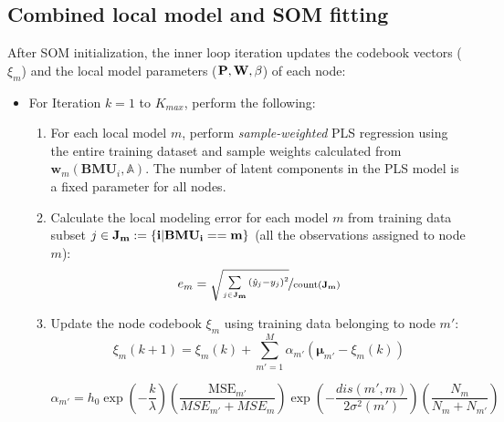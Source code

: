 \documentclass[review,3p]{elsarticle}
\renewcommand\[{\begin{equation}}
\renewcommand\]{\end{equation}}
\begin{document}
\subsection{Combined local model and SOM fitting}
After SOM initialization, the inner loop iteration updates the codebook
vectors ($\xi_m$) and the local model parameters ($\bf{P,W,\beta}$) of each node:
\begin{itemize}
\item For Iteration $k = 1$ to $K_{max}$, perform the following:

    \begin{enumerate}
    \item For each local model $m$, perform \emph{sample-weighted} PLS
        regression using the entire training dataset and sample weights
        calculated from $\mathbf w_m(\mathbf{BMU}_i,\mathbb A)$. The
        number of latent components in the PLS model is a fixed parameter
        for all nodes.
        \item Calculate the local modeling error for each model $m$ from training
            data subset $j \in \bf J_m := \{i | BMU_i == m\}$ (all the
            observations assigned to node $m$):
            \[{e_m} = \nicefrac{{\sqrt{\sum\limits_{j \in {\bf J_m}}^{} {{{\left( {{{\hat y}_j} - {y_j}} \right)}^2}}} }}{{{\rm{count}}\left( {{\bf J_m}} \right)}}
\label{eqn:local_error}            
            \]
    \item Update the node codebook $\xi_m$ using training data belonging
        to node $m'$: 
        \begin{equation} {\xi _m}\left( {k + 1} \right) =
        {\xi _m}\left( k \right) + \sum\limits_{m' = 1}^M {{\alpha
    _{m'}}\left( {{{\mathbf{\mu}}_{m'}} - {\xi _m}\left( k \right)}
    \right)} \label{eqn:codebook_update_batch}\end{equation}
    
	\[
	\alpha_{m'} = {h_0}\exp \left( { - \frac{k}{\lambda }} \right) \left(\frac{\mathrm{MSE}_{m'}}{{MS{E_{m'}} +MS{E_m}}}\right) 
	\exp \left( { - \frac{{dis\left(
                {m',m} \right)}}{{2{\sigma ^2}\left( {m'} \right)}}}\right) 
                \left( \frac{{{N_m}}}{{{N_m} + {N_{m'}}}} \right)
	\]
   

\end{enumerate}
\end{itemize}
\end{document}
